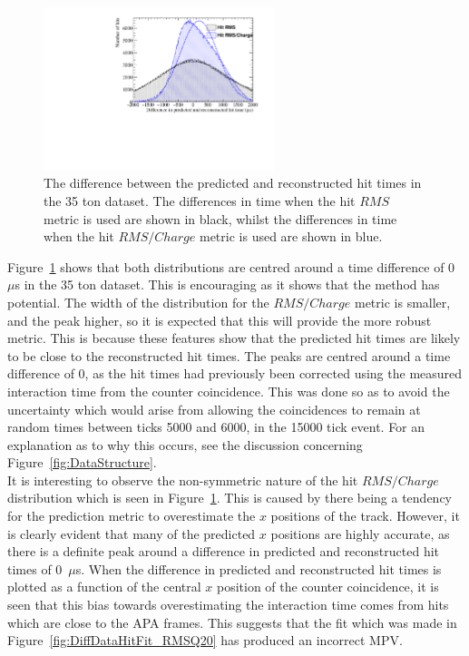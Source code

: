 \begin{figure}
  \centering
  \includegraphics[width=0.6\textwidth]{DifferenceInteractionTime_Data}
  \caption[The difference between the predicted and reconstructed hit times in the 35 ton dataset]
          {The difference between the predicted and reconstructed hit times in the 35 ton dataset. The differences in time when the hit $RMS$ metric is used are shown in black, whilst the differences in time when the hit $RMS/Charge$ metric is used are shown in blue.}
  \label{fig:DiffDataPredHit}
\end{figure}

Figure~\ref{fig:DiffDataPredHit} shows that both distributions are centred around a time difference of 0~$\mu$s in the 35 ton dataset. This is encouraging as it shows that the method has potential. The width of the distribution for the $RMS/Charge$ metric is smaller, and the peak higher, so it is expected that this will provide the more robust metric. This is because these features show that the predicted hit times are likely to be close to the reconstructed hit times. The peaks are centred around a time difference of 0, as the hit times had previously been corrected using the measured interaction time from the counter coincidence. This was done so as to avoid the uncertainty which would arise from allowing the coincidences to remain at random times between ticks 5000 and 6000, in the 15000 tick event. For an explanation as to why this occurs, see the discussion concerning Figure~\ref{fig:DataStructure}. \\

It is interesting to observe the non-symmetric nature of the hit $RMS/Charge$ distribution which is seen in Figure~\ref{fig:DiffDataPredHit}. This is caused by there being a tendency for the prediction metric to overestimate the $x$ positions of the track. However, it is clearly evident that many of the predicted $x$ positions are highly accurate, as there is a definite peak around a difference in predicted and reconstructed hit times of 0~$\mu$s. When the difference in predicted and reconstructed hit times is plotted as a function of the central $x$ position of the counter coincidence, it is seen that this bias towards overestimating the interaction time comes from hits which are close to the APA frames. This suggests that the fit which was made in Figure~\ref{fig:DiffDataHitFit_RMSQ20} has produced an incorrect MPV. \\

